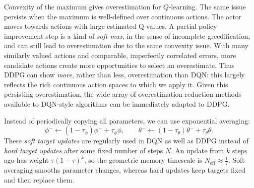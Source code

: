 \documentclass[11pt,a4paper]{article}
\begin{document}
Convexity
of the maximum gives overestimation for $Q$-learning.
The same issue persists when the maximum is well-defined over continuous
actions. The actor moves towards actions with large estimated Q-values.
A partial policy improvement step is a kind of \emph{soft max}, in the sense
of incomplete greedification, and can still lead to overestimation due to the same convexity issue. With many similarly valued actions and comparable, imperfectly correlated
errors, more candidate actions create more opportunities to select an
overestimate. Thus DDPG can show \emph{more}, rather than less, overestimation
than DQN: this largely reflects the rich continuous action spaces to which
we apply it. Given this persisting overestimation, the wide array of overestimation reduction methods
available to DQN-style algorithms can be immediately adapted to DDPG.

Instead of periodically copying all parameters, we can use exponential averaging:
\begin{equation}
 \phi^-\leftarrow(1-\tau_\phi)\phi^-+\tau_\phi\phi,
 \qquad
 \theta^-\leftarrow(1-\tau_\theta)\theta^-+\tau_\theta\theta.
\end{equation}
These \emph{soft target updates} are regularly used in DQN as well as DDPG instead of \emph{hard target updates} after some fixed number of steps $N$. 
An update from $k$ steps ago has weight $\tau(1-\tau)^k$, so the geometric
memory timescale is
$N_{\mathrm{eff}}\approx\frac{1}{\tau}$.
Soft averaging smooths parameter
changes, whereas hard updates keep targets fixed and then replace them.
\end{document}
